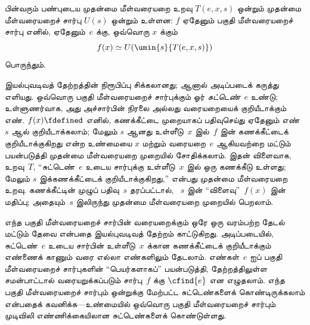 \documentclass[../../../include/open-logic-section]{subfiles}
\begin{document}


\begin{thm}[க்ளீனியின் இயல்புவடிவத் தேற்றம்]
பின்வரும் பண்புடைய முதன்மை மீள்வரையறை உறவு $T(e, x, s)$ ஒன்றும்
முதன்மை மீள்வரையறைச் சார்பு $U(s)$ ஒன்றும் உள்ளன: $f$ ஏதேனும்
பகுதி மீள்வரையறைச் சார்பு எனில், ஏதேனும்~$e$ க்கு, ஒவ்வொரு
$x$ க்கும்
\[
f(x) \simeq U(\umin{s}{T(e, x, s)})
\]
பொருந்தும்.
\end{thm}

\begin{explain}
இயல்புவடிவத் தேற்றத்தின் நிரூபிப்பு சிக்கலானது; ஆனால் அடிப்படைக்
கருத்து எளியது. ஒவ்வொரு பகுதி மீள்வரையறைச் சார்புக்கும் ஓர்
\emph{சுட்டெண்}~$e$ உண்டு; உள்ளுணர்வாக, அது அச்சார்பின் நிரலை
அல்லது வரையறையைக் குறியீடாக்கும் எண். $f(x) \fdefined$ எனில்,
கணக்கீட்டை முறையாகப் பதிவுசெய்து ஏதேனும் எண்~$s$ ஆல் குறியீடாக்கலாம்;
மேலும் $s$ ஆனது உள்ளீடு~$x$ இல்~$f$ இன் கணக்கீட்டைக் குறியீடாக்குகிறது
என்ற உண்மையை $x$ மற்றும் வரையறை~$e$ ஆகியவற்றை மட்டும் பயன்படுத்தி
முதன்மை மீள்வரையறை முறையில் சோதிக்கலாம். இதன் விளைவாக, உறவு~$T$,
“சுட்டெண்~$e$ உடைய சார்புக்கு உள்ளீடு~$x$ இல் ஒரு கணக்கீடு உள்ளது;
மேலும் $s$ இக்கணக்கீட்டைக் குறியீடாக்குகிறது,” என்பது முதன்மை
மீள்வரையறை உறவு. கணக்கீட்டின் முழுப் பதிவு~$s$ தரப்பட்டால்,
~$s$ இன் “விளைவு”~$f(x)$ இன் மதிப்பு; அதையும்~$s$ இலிருந்து
முதன்மை மீள்வரையறை முறையில் பெறலாம்.

எந்த பகுதி மீள்வரையறைச் சார்பின் வரையறைக்கும் ஒரே ஒரு வரம்பற்ற
தேடல் மட்டும் தேவை என்பதை இயல்புவடிவத் தேற்றம் காட்டுகிறது.
அடிப்படையில், சுட்டெண்~$e$ உடைய சார்பின் உள்ளீடு~$x$ க்கான
கணக்கீட்டைக் குறியீடாக்கும் எண்ணைக் காணும் வரை எல்லா எண்களிலும்
தேடலாம். எண்கள்~$e$ ஐப் பகுதி மீள்வரையறைச் சார்புகளின்
“பெயர்களாகப்” பயன்படுத்தி, தேற்றத்திலுள்ள சமன்பாட்டால் வரையறுக்கப்படும்
சார்பு~$f$ க்கு $\cfind{e}$ என எழுதலாம். எந்த பகுதி மீள்வரையறைச்
சார்பும் ஒன்றுக்கு மேற்பட்ட சுட்டெண்களைக் கொண்டிருக்கலாம் என்பதைக்
கவனிக்க---உண்மையில் ஒவ்வொரு பகுதி மீள்வரையறைச் சார்பும் முடிவிலி
எண்ணிக்கையிலான சுட்டெண்களைக் கொண்டுள்ளது.
\end{explain}
\end{document}
